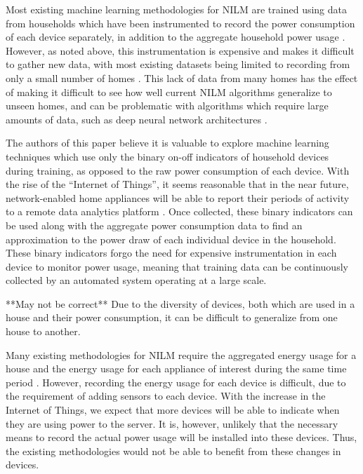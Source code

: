 \documentclass{article}
\begin{document}
Most existing machine learning methodologies for NILM are trained using data from households which have been instrumented to record the power consumption of each device separately, in addition to the aggregate household power usage \cite{Kelly}\cite{Cicchetti}.
However, as noted above, this instrumentation is expensive and makes it difficult to gather new data, with most existing datasets being limited to recording from only a small number of homes \cite{Redd}\cite{Kelly2}.
This lack of data from many homes has the effect of making it difficult to see how well current NILM algorithms generalize to unseen homes, and can be problematic with algorithms which require large amounts of data, such as deep neural network architectures \cite{Kelly}.

The authors of this paper believe it is valuable to explore machine learning techniques which use only the binary on-off indicators of household devices during training, as opposed to the raw power consumption of each device.
With the rise of the ``Internet of Things'', it seems reasonable that in the near future, network-enabled home appliances will be able to report their periods of activity to a remote data analytics platform \cite{Gubbi}.
Once collected, these binary indicators can be used along with the aggregate power consumption data to find an approximation to the power draw of each individual device in the household.
These binary indicators forgo the need for expensive instrumentation in each device to monitor power usage, meaning that training data can be continuously collected by an automated system operating at a large scale.


**May not be correct** Due to the diversity of devices, both which are used in a house and their power consumption, it can be difficult to generalize from one house to another.

Many existing methodologies for NILM require the aggregated energy usage for a house and the energy usage for each appliance of interest during the same time period \cite{Kelly}\cite{Cicchetti}.
However, recording the energy usage for each device is difficult, due to the requirement of adding sensors to each device.
With the increase in the Internet of Things, we expect that more devices will be able to indicate when they are using power to the server.
It is, however, unlikely that the necessary means to record the actual power usage will be installed into these devices.
Thus, the existing methodologies would not be able to benefit from these changes in devices.
\end{document}

